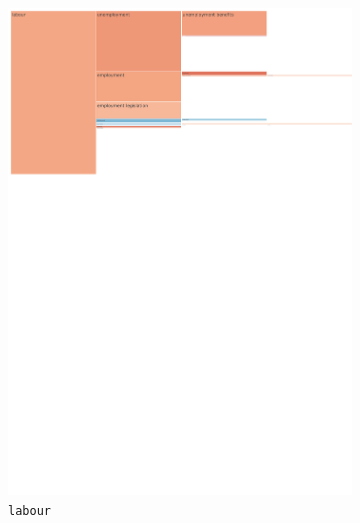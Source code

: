 \begin{figure}[!htbp]
{\begin{subfigure}{0.49\textwidth}
		\includegraphics[trim={0.15cm 19.5cm 5cm 0.15cm},clip,width=\linewidth]{figures/baly_iptc_weighted_prop_total_leaning_diff_zoom_labour.pdf}
		\caption{\texttt{labour}}
            \label{fig:baly_iptc_weighted_prop_total_leaning_diff_zoom_labour}
	\end{subfigure}
	\begin{subfigure}{0.49\textwidth}

\end{subfigure}}
\end{figure}

